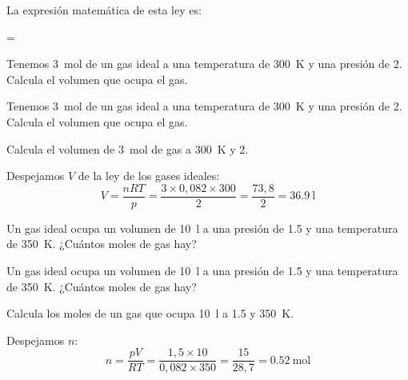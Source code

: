 La expresión matemática de esta ley es:
\vspace{20pt}
\begin{centeredequation}
    \cdot
    =
    \cdot
    \cdot
\end{centeredequation}
\vspace{25pt}
\begin{exercise}
    Tenemos \qty{3}{\mole} de un gas ideal a una temperatura de \qty{300}{\kelvin} y una presión de \qty{2}{\atmosphere}. Calcula el volumen que ocupa el gas.
    \begin{solu}
        Tenemos \qty{3}{\mole} de un gas ideal a una temperatura de \qty{300}{\kelvin} y una presión de \qty{2}{\atmosphere}. Calcula el volumen que ocupa el gas.

        Calcula el volumen de \qty{3}{\mole} de gas a \qty{300}{\kelvin} y \qty{2}{\atmosphere}.

        Despejamos \( V \) de la ley de los gases ideales:
        \begin{equation*}
            V = \dfrac{nRT}{p} = \dfrac{3 \times 0{,}082 \times 300}{2} = \dfrac{73{,}8}{2} = \qty{36.9}{\litre}
        \end{equation*}
    \end{solu}
\end{exercise}
\begin{exercise}
    Un gas ideal ocupa un volumen de \qty{10}{\litre} a una presión de \qty{1.5}{\atmosphere} y una temperatura de \qty{350}{\kelvin}. ¿Cuántos moles de gas hay?
    \begin{solu}
        Un gas ideal ocupa un volumen de \qty{10}{\litre} a una presión de \qty{1.5}{\atmosphere} y una temperatura de \qty{350}{\kelvin}. ¿Cuántos moles de gas hay?

        Calcula los moles de un gas que ocupa \qty{10}{\litre} a \qty{1.5}{\atmosphere} y \qty{350}{\kelvin}.

        Despejamos \( n \):
        \begin{equation*}
            n = \dfrac{pV}{RT} = \dfrac{1{,}5 \times 10}{0{,}082 \times 350} = \dfrac{15}{28{,}7} = \qty{0.52}{\mole}
        \end{equation*}
    \end{solu}
\end{exercise}
